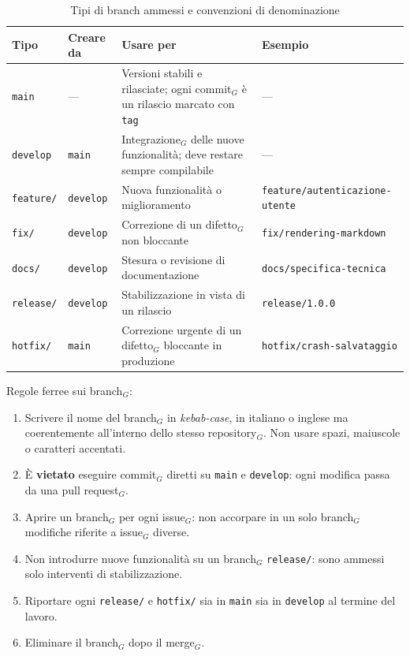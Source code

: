 \documentclass[a4paper, 10pt]{article}
\renewcommand{\arraystretch}{1.2}
\begin{document}
\begin{table}[H]
    \centering
    \renewcommand{\arraystretch}{1.3}
    \begin{tabularx}{\textwidth}{|l|l|L|L|}
        \hline
        \textbf{Tipo} & \textbf{Creare da} & \textbf{Usare per} & \textbf{Esempio} \\
        \hline
        \texttt{main} & --- & Versioni stabili e rilasciate; ogni commit$_G$ è un rilascio marcato con \texttt{tag} & --- \\ \hline
        \texttt{develop} & \texttt{main} & Integrazione$_G$ delle nuove funzionalità; deve restare sempre compilabile & --- \\ \hline
        \texttt{feature/} & \texttt{develop} & Nuova funzionalità o miglioramento & \texttt{feature/autenticazione-utente} \\ \hline
        \texttt{fix/} & \texttt{develop} & Correzione di un difetto$_G$ non bloccante & \texttt{fix/rendering-markdown} \\ \hline
        \texttt{docs/} & \texttt{develop} & Stesura o revisione di documentazione & \texttt{docs/specifica-tecnica} \\ \hline
        \texttt{release/} & \texttt{develop} & Stabilizzazione in vista di un rilascio & \texttt{release/1.0.0} \\ \hline
        \texttt{hotfix/} & \texttt{main} & Correzione urgente di un difetto$_G$ bloccante in produzione & \texttt{hotfix/crash-salvataggio} \\ \hline
    \end{tabularx}
    \caption{Tipi di branch ammessi e convenzioni di denominazione}
\end{table}

\noindent Regole ferree sui branch$_G$:
\begin{enumerate}
    \item Scrivere il nome del branch$_G$ in \textit{kebab-case}, in italiano o inglese ma coerentemente all'interno dello stesso repository$_G$. Non usare spazi, maiuscole o caratteri accentati.
    \item È \textbf{vietato} eseguire commit$_G$ diretti su \texttt{main} e \texttt{develop}: ogni modifica passa da una pull request$_G$.
    \item Aprire un branch$_G$ per ogni issue$_G$: non accorpare in un solo branch$_G$ modifiche riferite a issue$_G$ diverse.
    \item Non introdurre nuove funzionalità su un branch$_G$ \texttt{release/}: sono ammessi solo interventi di stabilizzazione.
    \item Riportare ogni \texttt{release/} e \texttt{hotfix/} sia in \texttt{main} sia in \texttt{develop} al termine del lavoro.
    \item Eliminare il branch$_G$ dopo il merge$_G$.
\end{enumerate}
\end{document}

